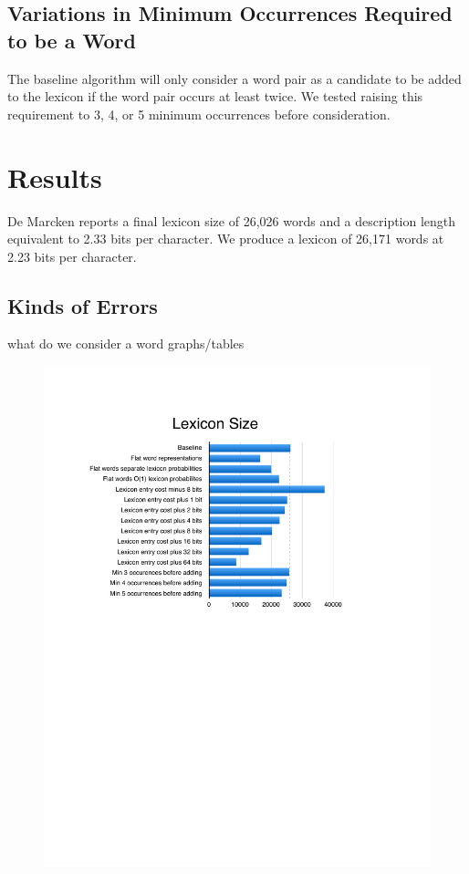 \documentclass[11pt, oneside, fleqn]{article}
\begin{document}
	\subsection{Variations in Minimum Occurrences Required to be a Word}
	
	The baseline algorithm will only consider a word pair as a candidate to be added to the lexicon if the word pair occurs at least twice. We tested raising this requirement to 3, 4, or 5 minimum occurrences before consideration.
 
   \section{Results}
   
   De Marcken reports a final lexicon size of 26,026 words and a description length equivalent to 2.33 bits per character. We produce a lexicon of 26,171 words at 2.23 bits per character.
   
   \subsection{Kinds of Errors}

  what do we consider a word
  graphs/tables
 
  \begin{figure}[h]
  \includegraphics{./figure/lexicon_size.pdf}
  \end{figure}
\end{document}
